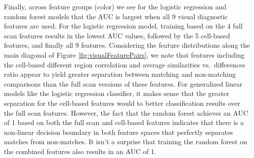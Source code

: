 \documentclass[11pt,]{isuthesis}
\begin{document}
Finally, across feature groups (color) we see for the logistic regression and random forest models that the AUC is largest when all 9 visual diagnostic features are used.
For the logistic regression model, training based on the 4 full scan features results in the lowest AUC values, followed by the 5 cell-based features, and finally all 9 features.
Considering the feature distributions along the main diagonal of Figure \ref{fig:visualFeaturePairs}, we note that features including the cell-based different region correlation and average similarities vs.~differences ratio appear to yield greater separation between matching and non-matching comparisons than the full scan versions of these features.
For generalized linear models like the logistic regression classifier, it makes sense that the greater separation for the cell-based features would to better classification results over the full scan features.
However, the fact that the random forest achieves an AUC of 1 based on both the full scan and cell-based features indicates that there is a non-linear decision boundary in both feature spaces that perfectly separates matches from non-matches.
It isn't a surprise that training the random forest on the combined features also results in an AUC of 1.
\end{document}
